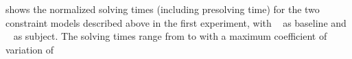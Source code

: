 \renewcommand{\thefigure}{\oldthefigure}

 shows the normalized
solving times (including presolving time) for the two \glspl{constraint model}
described above in the first experiment, with ~\modelA{} as \gls{baseline} and ~\modelB{}
as \gls{subject}.
%
The solving times range from
\printMinSolvingTime{
  \SolvTechDisableImplConsDefsDominateDefsPrePlusSolvingTimeSpeedupAllPrePlusSolvingTimeAvgMin,
  \SolvTechDisableImplConsDefsDominateDefsPrePlusSolvingTimeSpeedupPrePlusSolvingTimeAvgMin,
  \SolvTechDisableImplConsDefsInSpannedBlocksPrePlusSolvingTimeSpeedupPrePlusSolvingTimeAvgMin,
  \SolvTechDisableImplConsIdenticalEntryBlocksPrePlusSolvingTimeSpeedupPrePlusSolvingTimeAvgMin,
  \SolvTechDisableImplConsDefsDominateEntryBlocksPrePlusSolvingTimeSpeedupPrePlusSolvingTimeAvgMin,
  \SolvTechDisableImplConsPlacePhiOpsSameAsDefEdgesPrePlusSolvingTimeSpeedupPrePlusSolvingTimeAvgMin,
  \SolvTechDisableImplConsNoSpanUsesPrePlusSolvingTimeSpeedupPrePlusSolvingTimeAvgMin,
  \SolvTechDisableImplConsNoSpanDefsPrePlusSolvingTimeSpeedupPrePlusSolvingTimeAvgMin,
  \SolvTechDisableImplConsNoSpanUseDefsPrePlusSolvingTimeSpeedupPrePlusSolvingTimeAvgMin,
  \SolvTechDisableImplConsSpannedInputPrePlusSolvingTimeSpeedupPrePlusSolvingTimeAvgMin,
  \SolvTechDisableImplConsUsedDataMustBeAvailablePrePlusSolvingTimeSpeedupPrePlusSolvingTimeAvgMin,
  \SolvTechDisableImplConsExteriorDataMustBeAvailablePrePlusSolvingTimeSpeedupPrePlusSolvingTimeAvgMin,
  \SolvTechDisableImplConsLocsOfUsesPrePlusSolvingTimeSpeedupPrePlusSolvingTimeAvgMin,
  \SolvTechDisableImplConsLocsOfDefsPrePlusSolvingTimeSpeedupPrePlusSolvingTimeAvgMin,
  \SolvTechDisableImplConsFixFallThroughsPrePlusSolvingTimeSpeedupPrePlusSolvingTimeAvgMin
} to
\printMaxSolvingTime{
  \SolvTechDisableImplConsDefsDominateDefsPrePlusSolvingTimeSpeedupAllPrePlusSolvingTimeAvgMax,
  \SolvTechDisableImplConsDefsDominateDefsPrePlusSolvingTimeSpeedupPrePlusSolvingTimeAvgMax,
  \SolvTechDisableImplConsDefsInSpannedBlocksPrePlusSolvingTimeSpeedupPrePlusSolvingTimeAvgMax,
  \SolvTechDisableImplConsIdenticalEntryBlocksPrePlusSolvingTimeSpeedupPrePlusSolvingTimeAvgMax,
  \SolvTechDisableImplConsDefsDominateEntryBlocksPrePlusSolvingTimeSpeedupPrePlusSolvingTimeAvgMax,
  \SolvTechDisableImplConsPlacePhiOpsSameAsDefEdgesPrePlusSolvingTimeSpeedupPrePlusSolvingTimeAvgMax,
  \SolvTechDisableImplConsNoSpanUsesPrePlusSolvingTimeSpeedupPrePlusSolvingTimeAvgMax,
  \SolvTechDisableImplConsNoSpanDefsPrePlusSolvingTimeSpeedupPrePlusSolvingTimeAvgMax,
  \SolvTechDisableImplConsNoSpanUseDefsPrePlusSolvingTimeSpeedupPrePlusSolvingTimeAvgMax,
  \SolvTechDisableImplConsSpannedInputPrePlusSolvingTimeSpeedupPrePlusSolvingTimeAvgMax,
  \SolvTechDisableImplConsUsedDataMustBeAvailablePrePlusSolvingTimeSpeedupPrePlusSolvingTimeAvgMax,
  \SolvTechDisableImplConsExteriorDataMustBeAvailablePrePlusSolvingTimeSpeedupPrePlusSolvingTimeAvgMax,
  \SolvTechDisableImplConsLocsOfUsesPrePlusSolvingTimeSpeedupPrePlusSolvingTimeAvgMax,
  \SolvTechDisableImplConsLocsOfDefsPrePlusSolvingTimeSpeedupPrePlusSolvingTimeAvgMax,
  \SolvTechDisableImplConsFixFallThroughsPrePlusSolvingTimeSpeedupPrePlusSolvingTimeAvgMax
} with a maximum coefficient of variation of
